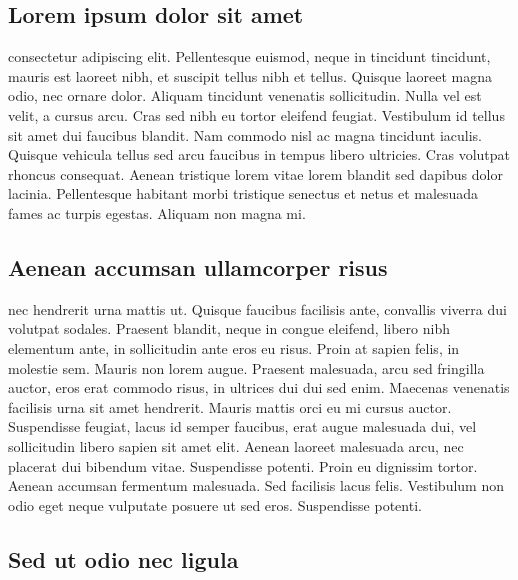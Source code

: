 \documentclass[]{article}
\date{}
\begin{document}
\hypertarget{lorem-ipsum-dolor-sit-amet}{%
\subsection{Lorem ipsum dolor sit
amet}\label{lorem-ipsum-dolor-sit-amet}}

consectetur adipiscing elit. Pellentesque euismod, neque in tincidunt
tincidunt, mauris est laoreet nibh, et suscipit tellus nibh et tellus.
Quisque laoreet magna odio, nec ornare dolor. Aliquam tincidunt
venenatis sollicitudin. Nulla vel est velit, a cursus arcu. Cras sed
nibh eu tortor eleifend feugiat. Vestibulum id tellus sit amet dui
faucibus blandit. Nam commodo nisl ac magna tincidunt iaculis. Quisque
vehicula tellus sed arcu faucibus in tempus libero ultricies. Cras
volutpat rhoncus consequat. Aenean tristique lorem vitae lorem blandit
sed dapibus dolor lacinia. Pellentesque habitant morbi tristique
senectus et netus et malesuada fames ac turpis egestas. Aliquam non
magna mi.

\hypertarget{aenean-accumsan-ullamcorper-risus}{%
\subsection{Aenean accumsan ullamcorper
risus}\label{aenean-accumsan-ullamcorper-risus}}

nec hendrerit urna mattis ut. Quisque faucibus facilisis ante, convallis
viverra dui volutpat sodales. Praesent blandit, neque in congue
eleifend, libero nibh elementum ante, in sollicitudin ante eros eu
risus. Proin at sapien felis, in molestie sem. Mauris non lorem augue.
Praesent malesuada, arcu sed fringilla auctor, eros erat commodo risus,
in ultrices dui dui sed enim. Maecenas venenatis facilisis urna sit amet
hendrerit. Mauris mattis orci eu mi cursus auctor. Suspendisse feugiat,
lacus id semper faucibus, erat augue malesuada dui, vel sollicitudin
libero sapien sit amet elit. Aenean laoreet malesuada arcu, nec placerat
dui bibendum vitae. Suspendisse potenti. Proin eu dignissim tortor.
Aenean accumsan fermentum malesuada. Sed facilisis lacus felis.
Vestibulum non odio eget neque vulputate posuere ut sed eros.
Suspendisse potenti.

\hypertarget{sed-ut-odio-nec-ligula}{%
\subsection{Sed ut odio nec ligula}\label{sed-ut-odio-nec-ligula}}
\end{document}
